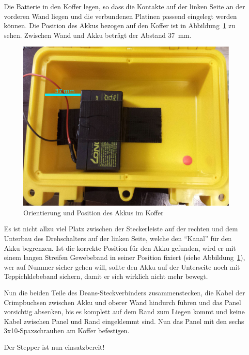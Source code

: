 \documentclass[paper=a4, open=any, numbers=noenddot]{scrbook}
\begin{document}
			Die Batterie in den Koffer legen, so dass die Kontakte auf der linken Seite an der vorderen Wand liegen und die verbundenen Platinen passend eingelegt werden können. Die Position des Akkus bezogen auf den Koffer ist in Abbildung~\ref{fig:akkuposition} zu sehen. Zwischen Wand und Akku beträgt der Abstand \SI{37}{\milli\metre}.

			\begin{figure}
				\centering\includegraphics[width=.8\textwidth]{Bilder/Akkuposition}
				\caption{Orientierung und Position des Akkus im Koffer}
				\label{fig:akkuposition}
			\end{figure}

			Es ist nicht allzu viel Platz zwischen der Steckerleiste auf der rechten und dem Unterbau des Drehschalters auf der linken Seite, welche den \enquote{Kanal} für den Akku begrenzen. Ist die korrekte Position für den Akku gefunden, wird er mit einem langen Streifen Gewebeband in seiner Position fixiert (siehe Abbildung~\ref{fig:akkuposition}), wer auf Nummer sicher gehen will, sollte den Akku auf der Unterseite noch mit Teppichklebeband sichern, damit er sich wirklich nicht mehr bewegt.

			Nun die beiden Teile des Deans-Steckverbinders zusammenstecken, die Kabel der Crimpbuchsen zwischen Akku und oberer Wand hindurch führen und das Panel vorsichtig absenken, bis es komplett auf dem Rand zum Liegen kommt und keine Kabel zwischen Panel und Rand eingeklemmt sind. Nun das Panel mit den sechs 3x10-Spaxschrauben am Koffer befestigen.

			\begin{center}
				Der Stepper ist nun einsatzbereit!
			\end{center}

			\cleardoublepage
\end{document}
